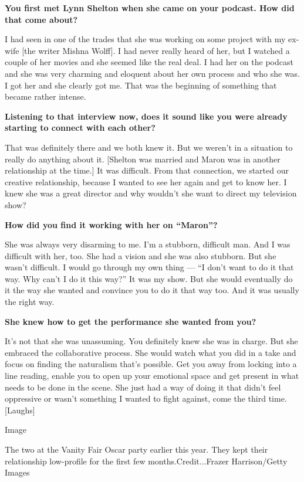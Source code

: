 \textbf{You first met Lynn Shelton when she came on your podcast. How
did that come about?}

I had seen in one of the trades that she was working on some project
with my ex-wife {[}the writer Mishna Wolff{]}. I had never really heard
of her, but I watched a couple of her movies and she seemed like the
real deal. I had her on the podcast and she was very charming and
eloquent about her own process and who she was. I got her and she
clearly got me. That was the beginning of something that became rather
intense.

\textbf{Listening to that interview now, does it sound like you were
already starting to connect with each other?}

That was definitely there and we both knew it. But we weren't in a
situation to really do anything about it. {[}Shelton was married and
Maron was in another relationship at the time.{]} It was difficult. From
that connection, we started our creative relationship, because I wanted
to see her again and get to know her. I knew she was a great director
and why wouldn't she want to direct my television show?

\textbf{How did you find it working with her on ``Maron''?}

She was always very disarming to me. I'm a stubborn, difficult man. And
I was difficult with her, too. She had a vision and she was also
stubborn. But she wasn't difficult. I would go through my own thing ---
``I don't want to do it that way. Why can't I do it this way?'' It was
my show. But she would eventually do it the way she wanted and convince
you to do it that way too. And it was usually the right way.

\textbf{She knew how to get the performance she wanted from you?}

It's not that she was unassuming. You definitely knew she was in charge.
But she embraced the collaborative process. She would watch what you did
in a take and focus on finding the naturalism that's possible. Get you
away from locking into a line reading, enable you to open up your
emotional space and get present in what needs to be done in the scene.
She just had a way of doing it that didn't feel oppressive or wasn't
something I wanted to fight against, come the third time. {[}Laughs{]}

Image

The two at the Vanity Fair Oscar party earlier this year. They kept
their relationship low-profile for the first few months.Credit...Frazer
Harrison/Getty Images

